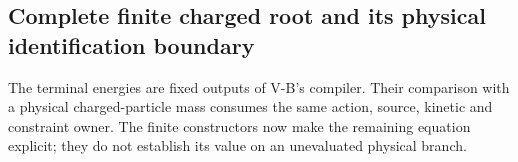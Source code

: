 \documentclass[12pt,a4paper]{article}
\begin{document}





\subsection{Complete finite charged root and its physical identification boundary}
\label{p12:sec:v2168-physical-charged-pole-handoff}
The terminal energies are fixed outputs of V-B's compiler.
Their comparison with a physical charged-particle mass consumes the same
action, source, kinetic and constraint owner. The finite constructors now
make the remaining equation explicit; they do not establish its value on
an unevaluated physical branch.
\end{document}

